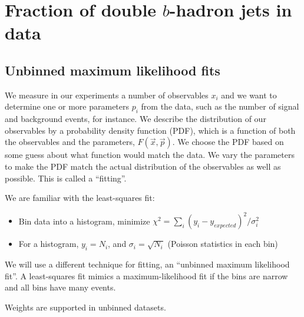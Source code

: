 %
%
\chapter{Fraction of double $b$-hadron jets in data}\label{ch:gbbfraction}

\section{Unbinned maximum likelihood fits}\label{sec:LLFits}


We measure in our experiments a number of observables $x_i$ and we want to determine one or more parameters $p_i$ from the data, such as the number of signal and background events, for instance. We describe the distribution of our observables by a probability density function (PDF), which is a function of both the observables and the parameters, $F(\vec{x},\vec{p})$. We choose the PDF based on some guess about what function would match the data.
We vary the parameters to make the PDF match the actual distribution of the observables as well as possible. This is called a ``fitting''.


We are familiar with the least-squares fit:
%
\begin{itemize}
\item
Bin data into a histogram, minimize $\chi^2 = \sum_i (y_i - y_{expected})^2 / \sigma^2_i$
\item
For a histogram, $y_i = N_i$, and $\sigma_i=\sqrt{N_i}$ (Poisson statistics in each bin)
\end{itemize}
%
We will use a different technique for fitting, an ``unbinned maximum likelihood fit''.  A least-squares fit mimics a maximum-likelihood fit if the bins are narrow and all bins have many events.  

Weights are supported in unbinned datasets. %



